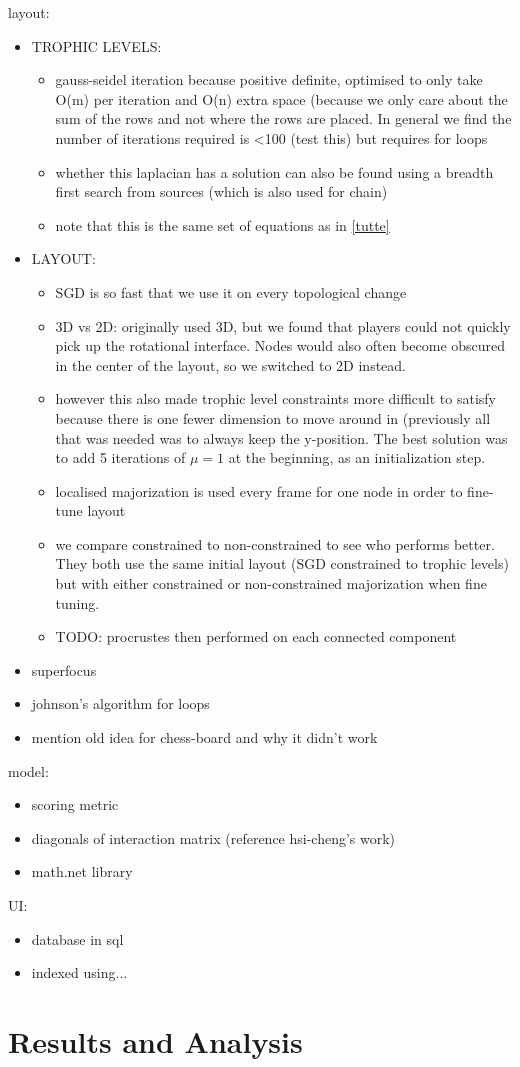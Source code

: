 layout:
\begin{itemize}
    \item TROPHIC LEVELS:
    \begin{itemize}
        \item gauss-seidel iteration because positive definite, optimised to only take O(m) per iteration and O(n) extra space (because we only care about the sum of the rows and not where the rows are placed. In general we find the number of iterations required is <100 (test this) but requires for loops~\cite{oliviasimpsonpaper}
        \item whether this laplacian has a solution can also be found using a breadth first search from sources (which is also used for chain)
        \item note that this is the same set of equations as in \eqref{tutte}
    \end{itemize}
    \item LAYOUT:
    \begin{itemize}
        \item SGD is so fast that we use it on every topological change
        \item 3D vs 2D: originally used 3D, but we found that players could not quickly pick up the rotational interface. Nodes would also often become obscured in the center of the layout, so we switched to 2D instead. 
        \item however this also made trophic level constraints more difficult to satisfy because there is one fewer dimension to move around in (previously all that was needed was to always keep the y-position. The best solution was to add 5 iterations of $\mu=1$ at the beginning, as an initialization step.
        \item localised majorization is used every frame for one node in order to fine-tune layout
        \item we compare constrained to non-constrained to see who performs better. They both use the same initial layout (SGD constrained to trophic levels) but with either constrained or non-constrained majorization when fine tuning.
        \item TODO: procrustes then performed on each connected component
    \end{itemize}
    
    \item superfocus
    \item johnson's algorithm for loops
    \item mention old idea for chess-board and why it didn't work
\end{itemize}

model:
\begin{itemize}
    \item scoring metric
    \item diagonals of interaction matrix (reference hsi-cheng's work)
    \item math.net library
\end{itemize}

UI:
\begin{itemize}
    \item database in sql
    \item indexed using...
\end{itemize}


\section{Results and Analysis}
